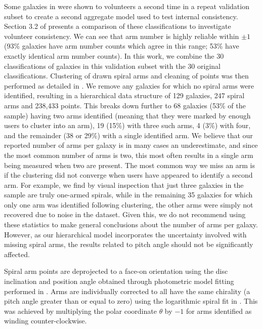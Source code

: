 Some galaxies in \citet{2020arXiv200610450L} were shown to volunteers a second time in a repeat validation subset to create a second aggregate model used to test internal consistency. Section 3.2 of \citet{2020arXiv200610450L} presents a comparison of these classifications to investigate volunteer consistency. We can see that arm number is highly reliable within $\pm1$ (93\% galaxies have arm number counts which agree in this range; 53\% have exactly identical arm number counts). In this work, we combine the 30 classifications of galaxies in this validation subset with the 30 original classifications. Clustering of drawn spiral arms and cleaning of points was then performed as detailed in \citet{2020arXiv200610450L}. We remove any galaxies for which no spiral arms were identified, resulting in a hierarchical data structure of 129 galaxies, 247 spiral arms and 238,433 points. This breaks down further to 68 galaxies (53\% of the sample) having two arms identified (meaning that they were marked by enough users to cluster into an arm), 19 (15\%) with three such arms, 4 (3\%) with four, and the remainder (38 or 29\%) with a single identified arm. We believe that our reported number of arms per galaxy is in many cases an underestimate, and since the most common number of arms is two, this most often results in a single arm being measured when two are present. The most common way we miss an arm is if the clustering did not converge when users have appeared to identify a second arm.
For example, we find by visual inspection that just three galaxies in the sample are truly one-armed spirals, while in the remaining 35 galaxies for which only one arm was identified following clustering, the other arms were simply not recovered due to noise in the dataset. Given this, we do not recommend using these statistics to make general conclusions about the number of arms per galaxy. However, as our hierarchical model incorporates the uncertainty involved with missing spiral arms, the results related to pitch angle should not be significantly affected.

Spiral arm points are deprojected to a face-on orientation using the disc inclination and position angle obtained through photometric model fitting performed in \citet{2020arXiv200610450L}. Arms are individually corrected to all have the same chirality (a pitch angle greater than or equal to zero) using the logarithmic spiral fit in \citet{2020arXiv200610450L}. This was achieved by multiplying the polar coordinate $\theta$ by $-1$ for arms identified as winding counter-clockwise.

